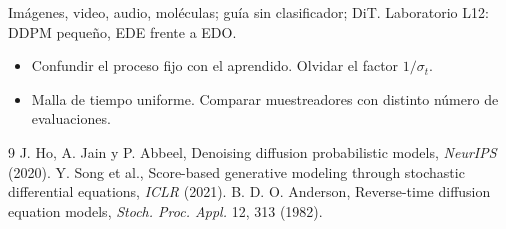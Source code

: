 \documentclass[11pt,a4paper]{article}
\begin{document}
\begin{aplicacion}
Imágenes, video, audio, moléculas; guía sin clasificador; DiT. Laboratorio L12: DDPM pequeño, EDE frente a EDO.
\end{aplicacion}

\begin{error}
\begin{itemize}[nosep]
\item Confundir el proceso fijo con el aprendido. \quad Olvidar el factor $1/\sigma_t$.
\item Malla de tiempo uniforme. \quad Comparar muestreadores con distinto número de evaluaciones.
\end{itemize}
\end{error}

\begin{thebibliography}{9}\small
{} J. Ho, A. Jain y P. Abbeel, Denoising diffusion probabilistic models, \emph{NeurIPS} (2020).
 Y. Song et al., Score-based generative modeling through stochastic differential equations, \emph{ICLR} (2021).
 B. D. O. Anderson, Reverse-time diffusion equation models, \emph{Stoch. Proc. Appl.} 12, 313 (1982).
\end{thebibliography}
\end{document}
